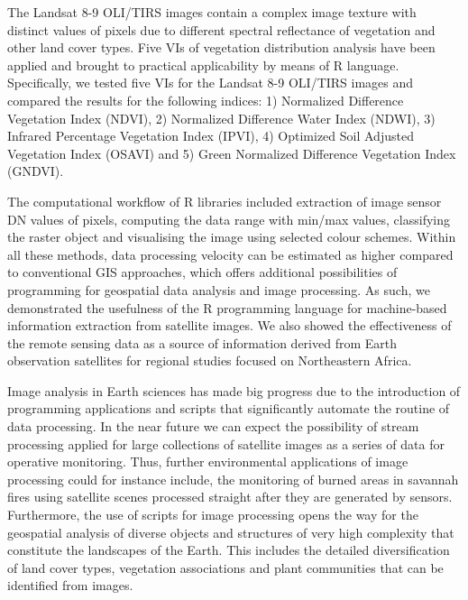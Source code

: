 \documentclass[jimaging,article,submit,pdftex,moreauthors]{Definitions/mdpi}
\begin{document}
The Landsat 8-9 OLI/TIRS images contain a complex image texture with distinct values of pixels due to different spectral reflectance of vegetation and other land cover types. Five VIs of vegetation distribution analysis have been applied and brought to practical applicability by means of R language. Specifically, we tested five VIs for the Landsat 8-9 OLI/TIRS images and compared the results for the following indices: 1) Normalized Difference Vegetation Index (NDVI), 2) Normalized Difference Water Index (NDWI), 3) Infrared Percentage Vegetation Index (IPVI), 4) Optimized Soil Adjusted Vegetation Index (OSAVI) and 5) Green Normalized Difference Vegetation Index (GNDVI). 

The computational workflow of R libraries included extraction of image sensor DN values of pixels, computing the data range with min/max values, classifying the raster object and visualising the image using selected colour schemes. Within all these methods, data processing velocity can be estimated as higher compared to conventional GIS approaches, which offers additional possibilities of programming for geospatial data analysis and image processing. As such, we demonstrated the usefulness of the R programming language for machine-based information extraction from satellite images. We also showed the effectiveness of the remote sensing data as a source of information derived from Earth observation satellites for regional studies focused on Northeastern Africa.

Image analysis in Earth sciences has made big progress due to the introduction of programming applications and scripts that significantly automate the routine of data processing. In the near future we can expect the possibility of stream processing applied for large collections of satellite images as a series of data for operative monitoring. Thus, further environmental applications of image processing could for instance include, the monitoring of burned areas in savannah fires using satellite scenes processed straight after they are generated by sensors. Furthermore, the use of scripts for image processing opens the way for the geospatial analysis of diverse objects and structures of very high complexity that constitute the landscapes of the Earth. This includes the detailed diversification of land cover types, vegetation associations and plant communities that can be identified from images.
\end{document}
